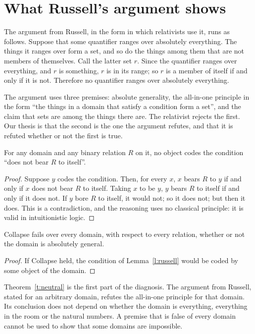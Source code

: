 \documentclass{situationist-preprint}
\begin{document}
\section{What Russell's argument shows}\label{s:russell}

The argument from Russell, in the form in which relativists use it, runs as follows. Suppose that some quantifier ranges over absolutely everything. The things it ranges over form a set, and so do the things among them that are not members of themselves. Call the latter set $r$. Since the quantifier ranges over everything, and $r$ is something, $r$ is in its range; so $r$ is a member of itself if and only if it is not. Therefore no quantifier ranges over absolutely everything.

The argument uses three premises: absolute generality, the all-in-one principle in the form \enquote{the things in a domain that satisfy a condition form a set}, and the claim that sets are among the things there are. The relativist rejects the first. Our thesis is that the second is the one the argument refutes, and that it is refuted whether or not the first is true.

\begin{lemma}\label{l:russell}
For any domain and any binary relation $R$ on it, no object codes the condition \enquote{does not bear $R$ to itself}.
\end{lemma}

\begin{proof}
Suppose $y$ codes the condition. Then, for every $x$, $x$ bears $R$ to $y$ if and only if $x$ does not bear $R$ to itself. Taking $x$ to be $y$, $y$ bears $R$ to itself if and only if it does not. If $y$ bore $R$ to itself, it would not; so it does not; but then it does. This is a contradiction, and the reasoning uses no classical principle: it is valid in intuitionistic logic.
\end{proof}

\begin{theorem}[Neutrality]\label{t:neutral}
Collapse fails over every domain, with respect to every relation, whether or not the domain is absolutely general.
\end{theorem}

\begin{proof}
If Collapse held, the condition of Lemma~\ref{l:russell} would be coded by some object of the domain.
\end{proof}

Theorem~\ref{t:neutral} is the first part of the diagnosis. The argument from Russell, stated for an arbitrary domain, refutes the all-in-one principle for that domain. Its conclusion does not depend on whether the domain is everything, everything in the room or the natural numbers. A premise that is false of every domain cannot be used to show that some domains are impossible.
\end{document}
